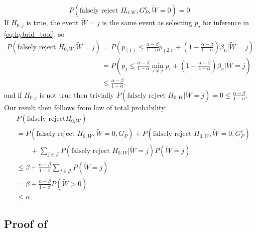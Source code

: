 \documentclass{article}
\begin{document}
\begin{appendix}
\begin{equation*}
    P(\text{falsely reject } H_{0, W}, G^c_P, \widetilde{W} = 0) = 0. 
\end{equation*}
If $H_{0, j}$ is true, the event $\widetilde{W} = j$ is the same event as selecting $p_j$ for inference in \eqref{eq:hybrid_tool}, so 
\begin{align*}
    P(\text{falsely reject } H_{0, W} | \widetilde{W} = j) &= P\left(p_{(1)} \leq \frac{\alpha-\beta}{1-\alpha} p_{(2)} + \left(1 - \frac{\alpha-\beta}{1-\alpha} \right) \beta_n | \widetilde{W} = j\right)\\
    &=  P\left(p_j \leq \frac{\alpha-\beta}{1-\alpha} \min_{i \neq j}p_i + \left(1 - \frac{\alpha-\beta}{1-\alpha} \right) \beta_n | \widetilde{W} = j\right)\\
    &\leq \frac{\alpha - \beta}{1-\alpha},
\end{align*}
and if $H_{0, j}$ is not true then trivially $P(\text{falsely reject } H_{0, W} | \widetilde{W} = j) = 0 \leq \frac{\alpha - \beta}{1-\alpha}$. Our result then follows from law of total probability:
\begin{align*}
    &P(\text{falsely reject} H_{0, W} )\\
    &= P(\text{falsely reject } H_{0, W}, \widetilde{W} = 0, G_P) + P(\text{falsely reject } H_{0, W}, \widetilde{W} = 0, G_P^c) \\
    &\qquad + \sum_{j \in \mathcal{J}}P(\text{falsely reject } H_{0, W} | \widetilde{W} = j ) P(\widetilde{W} = j)\\
    &\leq \beta + \frac{\alpha - \beta}{1-\beta} \sum_{j \in \mathcal{J}} P(\widetilde{W} = j)\\
    &= \beta + \frac{\alpha - \beta}{1-\beta} P(\widetilde{W} > 0)\\
    &\leq \alpha. 
\end{align*}

\subsection{Proof of }


\end{appendix}
\end{document}
